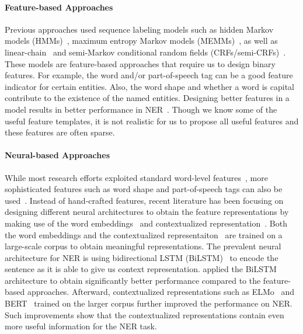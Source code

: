 \paragraph{Feature-based Approaches}
Previous approaches used sequence labeling models such as hidden Markov models (HMMs)~\cite{zhou2002named}, maximum entropy Markov models (MEMMs)~\cite{mccallum2000maximum}, as well as linear-chain~\cite{finkel2005incorporating} and semi-Markov conditional random fields (CRFs/semi-CRFs)~\cite{sarawagi2004semi}. 
These models are feature-based approaches that require us to design binary features.
For example, the word and/or part-of-speech tag can be a good feature indicator for certain entities. 
Also, the word shape and whether a word is capital contribute to the existence of the named entities. 
Designing better features in a model results in better performance in NER~\cite{lin2009phrase,passos2014lexicon}. 
Though we know some of the useful feature templates, it is not realistic for us to propose all useful features and these features are often sparse. 
\paragraph{Neural-based Approaches}
While most research efforts exploited standard word-level features~\cite{ratinov2009design}, more sophisticated features such as word shape and part-of-speech tags can also be used~\cite{finkel2005incorporating}. 
Instead of hand-crafted features, recent literature has been focusing on designing different neural architectures to obtain the feature representations by making use of the word embeddings~\cite{mikolov2013distributed} and contextualized representation~\cite{peters2018deep,devlin2019bert,akbik2018coling}. 
Both the word embeddings and the contextualized representaiton~\cite{smith2019contextual} are trained on a large-scale corpus to obtain meaningful representations. 
The prevalent neural architecture for NER is using bidirectional LSTM (BiLSTM)~\cite{hochreiter1997long} to encode the sentence as it is able to give us context representation. 
\citet{chiu2016named,lample2016neural,ma2016end} applied the BiLSTM architecture to obtain significantly better performance compared to the feature-based approaches. 
Afterward, contextualized representations such as ELMo~\cite{peters2018deep} and BERT~\cite{devlin2019bert} trained on the larger corpus further improved the performance on NER.
Such improvements show that the contextualized representations contain even more useful information for the NER task.








